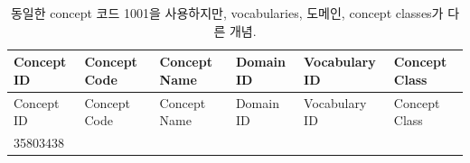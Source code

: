 \documentclass[11pt]{book}
\theoremstyle{definition}
\theoremstyle{definition}
\theoremstyle{definition}
\theoremstyle{remark}
\begin{document}
\begin{longtable}[]{@{}llllll@{}}
\caption{\label{tab:code1001} 동일한 concept 코드 1001을 사용하지만,
vocabularies, 도메인, concept classes가 다른 개념.}\tabularnewline
\toprule
\begin{minipage}[b]{0.13\columnwidth}\raggedright\strut
Concept ID\strut
\end{minipage} & \begin{minipage}[b]{0.07\columnwidth}\raggedright\strut
Concept Code\strut
\end{minipage} & \begin{minipage}[b]{0.16\columnwidth}\raggedright\strut
Concept Name\strut
\end{minipage} & \begin{minipage}[b]{0.14\columnwidth}\raggedright\strut
Domain ID\strut
\end{minipage} & \begin{minipage}[b]{0.14\columnwidth}\raggedright\strut
Vocabulary ID\strut
\end{minipage} & \begin{minipage}[b]{0.14\columnwidth}\raggedright\strut
Concept Class\strut
\end{minipage}\tabularnewline
\midrule
\endfirsthead
\toprule
\begin{minipage}[b]{0.13\columnwidth}\raggedright\strut
Concept ID\strut
\end{minipage} & \begin{minipage}[b]{0.07\columnwidth}\raggedright\strut
Concept Code\strut
\end{minipage} & \begin{minipage}[b]{0.16\columnwidth}\raggedright\strut
Concept Name\strut
\end{minipage} & \begin{minipage}[b]{0.14\columnwidth}\raggedright\strut
Domain ID\strut
\end{minipage} & \begin{minipage}[b]{0.14\columnwidth}\raggedright\strut
Vocabulary ID\strut
\end{minipage} & \begin{minipage}[b]{0.14\columnwidth}\raggedright\strut
Concept Class\strut
\end{minipage}\tabularnewline
\midrule
\endhead
\begin{minipage}[t]{0.13\columnwidth}\raggedright\strut
35803438\strut
\end{minipage} & \begin{minipage}[t]{0.07\columnwidth}\raggedright\strut

\end{minipage}
\end{longtable}
\end{document}
